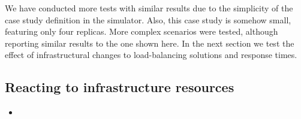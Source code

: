 We have conducted more tests with similar results due to the
simplicity of the case study definition in the simulator. Also, this
case study is somehow small, featuring only four replicas. More
complex scenarios were tested, although reporting similar results to
the one shown here. In the next section we test the effect of
infrastructural changes to load-balancing solutions and response
times.

\subsection{Reacting to infrastructure resources}

\begin{itemize}
\item {}
\end{itemize}

